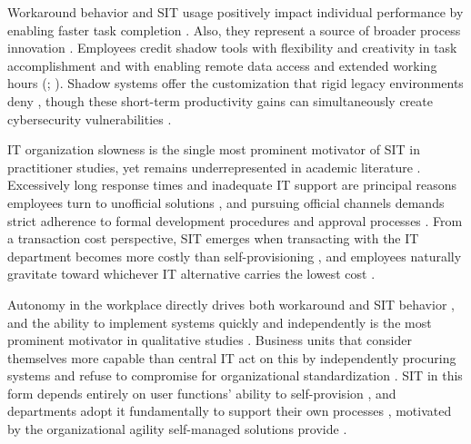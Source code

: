 \documentclass[12pt,oneside]{article}
\begin{document}
Workaround behavior and \ac{SIT} usage positively impact individual performance by enabling faster task completion \citep[239]{pinto2023encourage}. Also, they represent a source of broader process innovation \citep[114]{white2023workarounds}. Employees credit shadow tools with flexibility and creativity in task accomplishment and with enabling remote data access and extended working hours (\citealp[1171]{trialih2023challenge}; \citealp[2]{koch2014consumerization}). Shadow systems offer the customization that rigid legacy environments deny \citep[108]{myers2017impact}, though these short-term productivity gains can simultaneously create cybersecurity vulnerabilities \citep[1]{manga2025cracks}.

\ac{IT} organization slowness is the single most prominent motivator of \ac{SIT} in practitioner studies, yet remains underrepresented in academic literature \citep[16]{kopper2019shadowit}. Excessively long response times and inadequate \ac{IT} support are principal reasons employees turn to unofficial solutions \citep[3]{keskin2021domesticating}, and pursuing official channels demands strict adherence to formal development procedures and approval processes \citep[9]{chua2014central}. From a transaction cost perspective, \ac{SIT} emerges when transacting with the \ac{IT} department becomes more costly than self-provisioning \citep[7]{zimmermann2014managing}, and employees naturally gravitate toward whichever \ac{IT} alternative carries the lowest cost \citep[4]{lueker2016consumerization}.

Autonomy in the workplace directly drives both workaround and \ac{SIT} behavior \citep[239]{pinto2023encourage}, and the ability to implement systems quickly and independently is the most prominent motivator in qualitative studies \citep[5]{klotz2019transformed}. Business units that consider themselves more capable than central \ac{IT} act on this by independently procuring systems and refuse to compromise for organizational standardization \citep[16]{kopper2019shadowit}. \ac{SIT} in this form depends entirely on user functions' ability to self-provision \citep[7]{chua2014central}, and departments adopt it fundamentally to support their own processes \citep[1]{zimmermann2014managing}, motivated by the organizational agility self-managed solutions provide \citep[12]{kopper2018business}.
\end{document}
